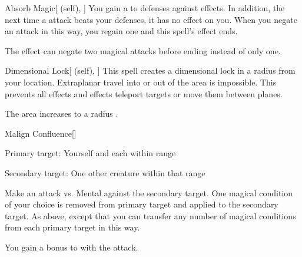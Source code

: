 \lowercase{\hypertarget{spell:Absorb Magic}{}}\label{spell:Absorb Magic}
\begin{attuneability}[Rank 6]{\hypertarget{spell:Absorb Magic}{Absorb Magic}}[ (self), ]
You gain a   to defenses against  effects.
In addition, the next time a  attack beats your defenses, it has no effect on you.
When you negate an attack in this way, you regain one  and this spell's effect ends.

\rankline
{} The effect can negate two magical attacks before ending instead of only one.
\end{attuneability}
\vspace{0.25em}



\lowercase{\hypertarget{spell:Dimensional Lock}{}}\label{spell:Dimensional Lock}
\begin{attuneability}[Rank 6]{\hypertarget{spell:Dimensional Lock}{Dimensional Lock}}[ (self), ]
\targetrule
This spell creates a dimensional lock in a \arealarge radius  from your location.
Extraplanar travel into or out of the area is impossible.
This prevents all  effects and effects teleport targets or move them between planes.

\rankline
{} The area increases to a \areahuge radius .
\end{attuneability}
\vspace{0.25em}



\lowercase{\hypertarget{spell:Malign Confluence}{}}\label{spell:Malign Confluence}
\begin{freeability}[Rank 6]{\hypertarget{spell:Malign Confluence}{Malign Confluence}}[]

Primary target: Yourself and each  within \rngmed range
\par\noindent
Secondary target: One other creature within that range

Make an attack vs. Mental against the secondary target.
\hit One magical condition of your choice is removed from primary target and applied to the secondary target.
\crit As above, except that you can transfer any number of magical conditions from each primary target in this way.

 You gain a  bonus to  with the attack.
\end{freeability}
\vspace{0.25em}




